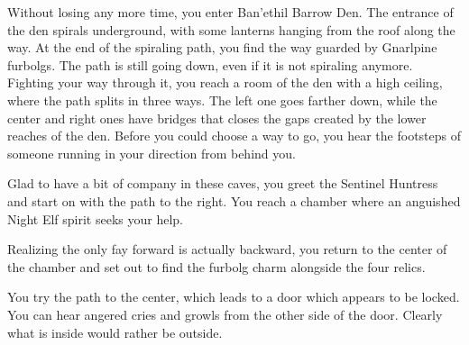 Without losing any more time, you enter Ban'ethil Barrow Den. The entrance of the den spirals underground, with some lanterns hanging from the roof along the way. At the end of the spiraling path, you find the way guarded by Gnarlpine furbolgs. The path is still going down, even if it is not spiraling anymore. Fighting your way through it, you reach a room of the den with a high ceiling, where the path splits in three ways. The left one goes farther down, while the center and right ones have bridges that closes the gaps created by the lower reaches of the den. Before you could choose a way to go, you hear the footsteps of someone running in your direction from behind you.



Glad to have a bit of company in these caves, you greet the Sentinel Huntress and start on with the path to the right. You reach a chamber where an anguished Night Elf spirit seeks your help.


Realizing the only fay forward is actually backward, you return to the center of the chamber and set out to find the furbolg charm alongside the four relics.

You try the path to the center, which leads to a door which appears to be locked. You can hear angered cries and growls from the other side of the door. Clearly what is inside would rather be outside.



